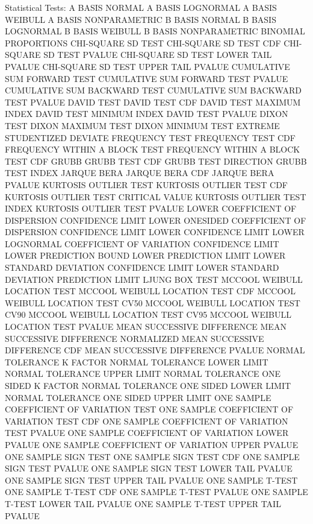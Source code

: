 Statistical Tests:
   A BASIS NORMAL
   A BASIS LOGNORMAL
   A BASIS WEIBULL
   A BASIS NONPARAMETRIC
   B BASIS NORMAL
   B BASIS LOGNORMAL
   B BASIS WEIBULL
   B BASIS NONPARAMETRIC
   BINOMIAL PROPORTIONS
   CHI-SQUARE SD TEST
   CHI-SQUARE SD TEST CDF
   CHI-SQUARE SD TEST PVALUE
   CHI-SQUARE SD TEST LOWER TAIL PVALUE
   CHI-SQUARE SD TEST UPPER TAIL PVALUE
   CUMULATIVE SUM FORWARD TEST
   CUMULATIVE SUM FORWARD TEST PVALUE
   CUMULATIVE SUM BACKWARD TEST
   CUMULATIVE SUM BACKWARD TEST PVALUE
   DAVID TEST
   DAVID TEST CDF
   DAVID TEST MAXIMUM INDEX
   DAVID TEST MINIMUM INDEX
   DAVID TEST PVALUE
   DIXON TEST
   DIXON MAXIMUM TEST
   DIXON MINIMUM TEST
   EXTREME STUDENTIZED DEVIATE
   FREQUENCY TEST
   FREQUENCY TEST CDF
   FREQUENCY WITHIN A BLOCK TEST
   FREQUENCY WITHIN A BLOCK TEST CDF
   GRUBB 
   GRUBB TEST CDF
   GRUBB TEST DIRECTION
   GRUBB TEST INDEX
   JARQUE BERA
   JARQUE BERA CDF
   JARQUE BERA PVALUE
   KURTOSIS OUTLIER TEST
   KURTOSIS OUTLIER TEST CDF
   KURTOSIS OUTLIER TEST CRITICAL VALUE
   KURTOSIS OUTLIER TEST INDEX
   KURTOSIS OUTLIER TEST PVALUE
   LOWER COEFFICIENT OF DISPERSION CONFIDENCE LIMIT
   LOWER ONESIDED COEFFICIENT OF DISPERSION CONFIDENCE LIMIT
   LOWER CONFIDENCE LIMIT
   LOWER LOGNORMAL COEFFICIENT OF VARIATION CONFIDENCE LIMIT
   LOWER PREDICTION BOUND
   LOWER PREDICTION LIMIT
   LOWER STANDARD DEVIATION CONFIDENCE LIMIT
   LOWER STANDARD DEVIATION PREDICTION LIMIT
   LJUNG BOX TEST
   MCCOOL WEIBULL LOCATION TEST
   MCCOOL WEIBULL LOCATION TEST CDF
   MCCOOL WEIBULL LOCATION TEST CV50
   MCCOOL WEIBULL LOCATION TEST CV90
   MCCOOL WEIBULL LOCATION TEST CV95
   MCCOOL WEIBULL LOCATION TEST PVALUE
   MEAN SUCCESSIVE DIFFERENCE
   MEAN SUCCESSIVE DIFFERENCE NORMALIZED
   MEAN SUCCESSIVE DIFFERENCE CDF
   MEAN SUCCESSIVE DIFFERENCE PVALUE
   NORMAL TOLERANCE K FACTOR
   NORMAL TOLERANCE LOWER LIMIT
   NORMAL TOLERANCE UPPER LIMIT
   NORMAL TOLERANCE ONE SIDED K FACTOR
   NORMAL TOLERANCE ONE SIDED LOWER LIMIT
   NORMAL TOLERANCE ONE SIDED UPPER LIMIT
   ONE SAMPLE COEFFICIENT OF VARIATION TEST
   ONE SAMPLE COEFFICIENT OF VARIATION TEST CDF
   ONE SAMPLE COEFFICIENT OF VARIATION TEST PVALUE
   ONE SAMPLE COEFFICIENT OF VARIATION LOWER PVALUE
   ONE SAMPLE COEFFICIENT OF VARIATION UPPER PVALUE
   ONE SAMPLE SIGN TEST
   ONE SAMPLE SIGN TEST CDF
   ONE SAMPLE SIGN TEST PVALUE
   ONE SAMPLE SIGN TEST LOWER TAIL PVALUE
   ONE SAMPLE SIGN TEST UPPER TAIL PVALUE
   ONE SAMPLE T-TEST
   ONE SAMPLE T-TEST CDF
   ONE SAMPLE T-TEST PVALUE
   ONE SAMPLE T-TEST LOWER TAIL PVALUE
   ONE SAMPLE T-TEST UPPER TAIL PVALUE
